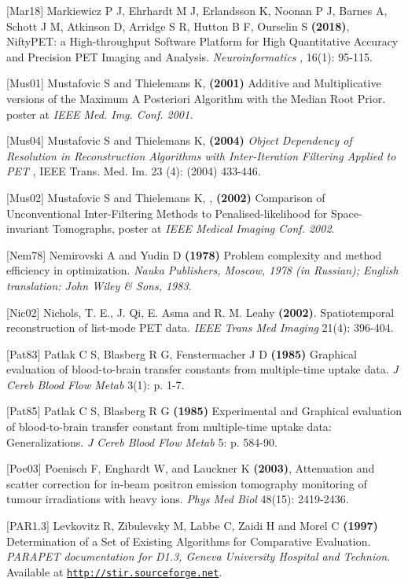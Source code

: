 \documentclass{article}
\def\url#1#2{\mbox{\href{#1}{\tt #2}}}
\begin{document}
{{{{{{[Mar18] Markiewicz P J, Ehrhardt M J, Erlandsson K, Noonan P J, Barnes A, Schott J M, 
Atkinson D, Arridge S R, Hutton B F, Ourselin S \textbf{(2018)}, 
NiftyPET: a High-throughput Software Platform for High 
Quantitative Accuracy and Precision PET Imaging and Analysis.
\textit { Neuroinformatics }, 16(1): 95-115.

{[}Mus01] Mustafovic S and Thielemans K, \textbf{(2001)} Additive and Multiplicative 
versions of the Maximum A Posteriori Algorithm with the Median 
Root Prior. poster at \textit{IEEE Med. Img. Conf. 2001.}

{[}Mus04] Mustafovic S and Thielemans K, \textbf{(200}\textbf{4}\textbf{)} \textit{Object 
Dependency of Resolution in Reconstruction Algorithms with Inter-Iteration 
Filtering Applied to PET} , IEEE Trans. Med. Im. 23 (4): (2004) 
433-446.

{[}Mus02] Mustafovic S and Thielemans K, \textit{,} \textbf{(2002)}  Comparison 
of Unconventional Inter-Filtering Methods to Penalised-likelihood 
for Space-invariant Tomographs, poster at \textit{IEEE Medical Imaging 
Conf. 2002}.

{[}Nem78] Nemirovski A and Yudin D \textbf{(1978)} Problem complexity 
and method efficiency in optimization. \textit{Nauka Publishers, 
Moscow, 1978 (in Russian); English translation: John Wiley \& 
Sons, 1983}.

{[}Nic02] Nichols, T. E., J. Qi, E. Asma and R. M. Leahy \textbf{(2002)}. Spatiotemporal reconstruction of list-mode PET data.  \textit{IEEE Trans Med Imaging} 21(4): 396-404.

{[}Pat83] Patlak C S, Blasberg R G, Fenstermacher J D \textbf{(1985)}  Graphical evaluation of blood-to-brain 
transfer constants from multiple-time uptake data. \textit{J Cereb Blood Flow Metab} 3(1): p. 1-7.

{[}Pat85] Patlak C S, Blasberg R G \textbf{(1985)}  Experimental and Graphical evaluation of blood-to-brain 
transfer constant from multiple-time uptake data: Generalizations. \textit{J Cereb Blood Flow Metab} 5: p. 584-90.

{[}Poe03{]} Poenisch F, Enghardt W, and Lauckner K \textbf{(2003)}, 
Attenuation and scatter correction for in-beam positron emission tomography 
monitoring of tumour irradiations with heavy ions. \textit { Phys Med Biol } 48(15): 2419-2436. 

 {[}PAR1.3] Levkovitz R, Zibulevsky M, Labbe C, Zaidi H and Morel 
C \textbf{(1997)} Determination of a Set of Existing Algorithms for 
Comparative Evaluation. \textit{PARAPET documentation for D1.3, Geneva 
University Hospital and Technion}. \\
Available at \url{http://stir.sourceforge.net }{http://stir.sourceforge.net}. 

}}}}}}
\end{document}

